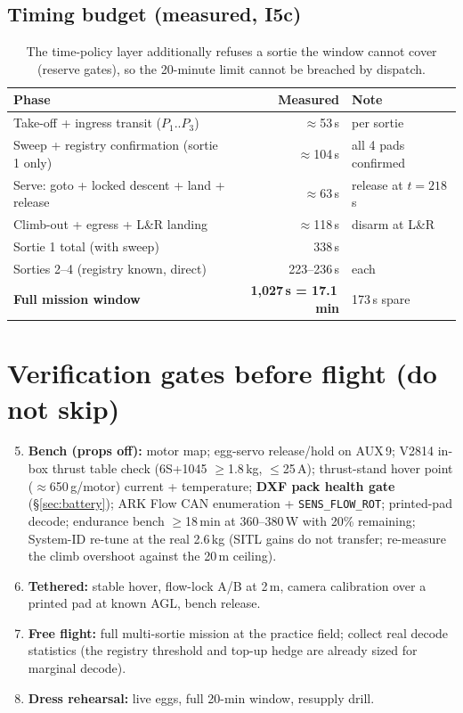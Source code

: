 \documentclass[11pt,a4paper]{article}
\begin{document}
\subsection{Timing budget (measured, I5c)}
\begin{table}[H]\centering\small
\begin{tabular}{@{}lrl@{}}
\toprule
Phase & Measured & Note \\
\midrule
Take-off + ingress transit ($P_1..P_3$) & $\approx$53\,s & per sortie \\
Sweep + registry confirmation (sortie 1 only) & $\approx$104\,s & all 4 pads confirmed \\
Serve: goto + locked descent + land + release & $\approx$63\,s & release at $t{=}218$\,s \\
Climb-out + egress + L\&R landing & $\approx$118\,s & disarm at L\&R \\
\midrule
Sortie 1 total (with sweep) & 338\,s & \\
Sorties 2--4 (registry known, direct) & 223--236\,s & each \\
\textbf{Full mission window} & \textbf{1{,}027\,s = 17.1\,min} & 173\,s spare \\
\bottomrule
\end{tabular}
\caption{The time-policy layer additionally refuses a sortie the window cannot
cover (reserve gates), so the 20-minute limit cannot be breached by dispatch.}
\end{table}

\section{Verification gates before flight (do not skip)}
\begin{enumerate}[label=G\arabic*., leftmargin=2em]
\setcounter{enumi}{4}
\item \textbf{Bench (props off):} motor map; egg-servo release/hold on AUX\,9;
      V2814 in-box thrust table check (6S+1045 $\ge$1.8\,kg, $\le$25\,A);
      thrust-stand hover point ($\approx$650\,g/motor) current + temperature;
      \textbf{DXF pack health gate} (\S\ref{sec:battery}); ARK Flow CAN
      enumeration + \texttt{SENS\_FLOW\_ROT}; printed-pad decode; endurance
      bench $\ge$18\,min at 360--380\,W with 20\% remaining; System-ID re-tune
      at the real 2.6\,kg (SITL gains do not transfer; re-measure the climb
      overshoot against the 20\,m ceiling).
\item \textbf{Tethered:} stable hover, flow-lock A/B at 2\,m, camera
      calibration over a printed pad at known AGL, bench release.
\item \textbf{Free flight:} full multi-sortie mission at the practice field;
      collect real decode statistics (the registry threshold and top-up hedge
      are already sized for marginal decode).
\item \textbf{Dress rehearsal:} live eggs, full 20-min window, resupply drill.
\end{enumerate}
\end{document}
